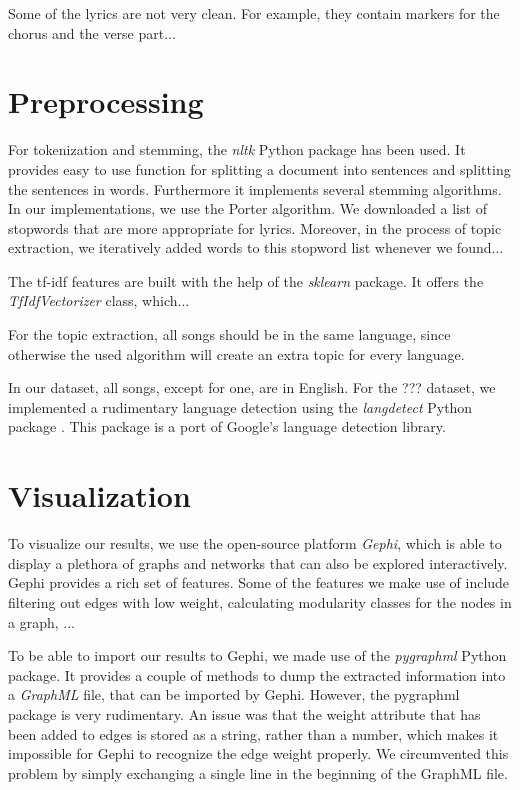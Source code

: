 \documentclass[10pt,a4paper]{article}
\begin{document}
	Some of the lyrics are not very clean. For example, they contain markers for the chorus and the verse part...

	\section{Preprocessing}	
	\label{sec:preprocessing}
	For tokenization and stemming, the \textit{nltk} Python package has been used. It provides easy to use function for splitting a document into sentences and splitting the sentences in words. Furthermore it implements several stemming algorithms. In our implementations, we use the Porter algorithm. We downloaded a list of stopwords that are more appropriate for lyrics. Moreover, in the process of topic extraction, we iteratively added words to this stopword list whenever we found...
	
	The tf-idf features are built with the help of the \textit{sklearn} package. It offers the \textit{TfIdfVectorizer} class, which...
	
	For the topic extraction, all songs should be in the same language, since otherwise the used algorithm will create an extra topic for every language.
	
	In our dataset, all songs, except for one, are in English. For the ??? dataset, we implemented a rudimentary language detection using the \textit{langdetect} Python package \cite{langdetect}. This package is a port of Google's language detection library.
	
	\section{Visualization}
	\label{sec:visualization}
	To visualize our results, we use the open-source platform \textit{Gephi}, which is able to display a plethora of graphs and networks that can also be explored interactively. Gephi provides a rich set of features. Some of the features we make use of include filtering out edges with low weight, calculating modularity classes for the nodes in a graph, ...
	
	To be able to import our results to Gephi, we made use of the \textit{pygraphml} Python package. It provides a couple of methods to dump the extracted information into a \textit{GraphML} file, that can be imported by Gephi. However, the pygraphml package is very rudimentary. An issue was that the weight attribute that has been added to edges is stored as a string, rather than a number, which makes it impossible for Gephi to recognize the edge weight properly. We circumvented this problem by simply exchanging a single line in the beginning of the GraphML file.
	
\end{document}
